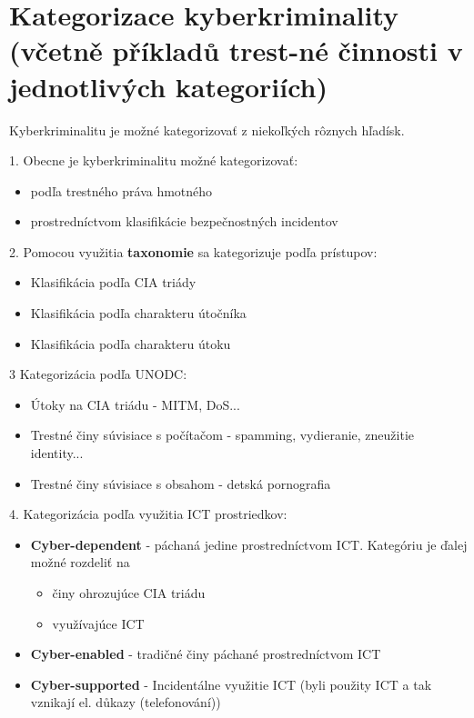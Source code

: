 \newpage
\section[Kategorizace kyberkriminality (včetně příkladů trestné činnosti v jednotlivých kategoriích)]{Kategorizace kyberkriminality (včetně příkladů trest-né činnosti v jednotlivých kategoriích)}
\label{kategorizace}
Kyberkriminalitu je možné kategorizovať z niekoľkých rôznych hľadísk. 

1. Obecne je kyberkriminalitu možné kategorizovať:
\begin{itemize}
    \item podľa trestného práva hmotného
    \item prostredníctvom klasifikácie bezpečnostných incidentov
\end{itemize}
2. Pomocou využitia \textbf{taxonomie} sa kategorizuje podľa prístupov:
\begin{itemize}
    \item Klasifikácia podľa CIA triády
    \item Klasifikácia podľa charakteru útočníka
    \item Klasifikácia podľa charakteru útoku
\end{itemize}
3 Kategorizácia podľa UNODC:
\begin{itemize}
    \item Útoky na CIA triádu - MITM, DoS...
    \item Trestné činy súvisiace s počítačom - spamming, vydieranie, zneužitie identity...
    \item Trestné činy súvisiace s obsahom - detská pornografia
\end{itemize}
4. Kategorizácia podľa využitia ICT prostriedkov:
\begin{itemize}
    \item \textbf{Cyber-dependent} - páchaná jedine prostredníctvom ICT. Kategóriu je ďalej možné rozdeliť na
    \begin{itemize}
        \item činy ohrozujúce CIA triádu
        \item využívajúce ICT
    \end{itemize}   
    \item \textbf{Cyber-enabled} - tradičné činy páchané prostredníctvom ICT
    \item \textbf{Cyber-supported} - Incidentálne využitie ICT (byli použity ICT a tak vznikají el. důkazy (telefonování))
\end{itemize}


